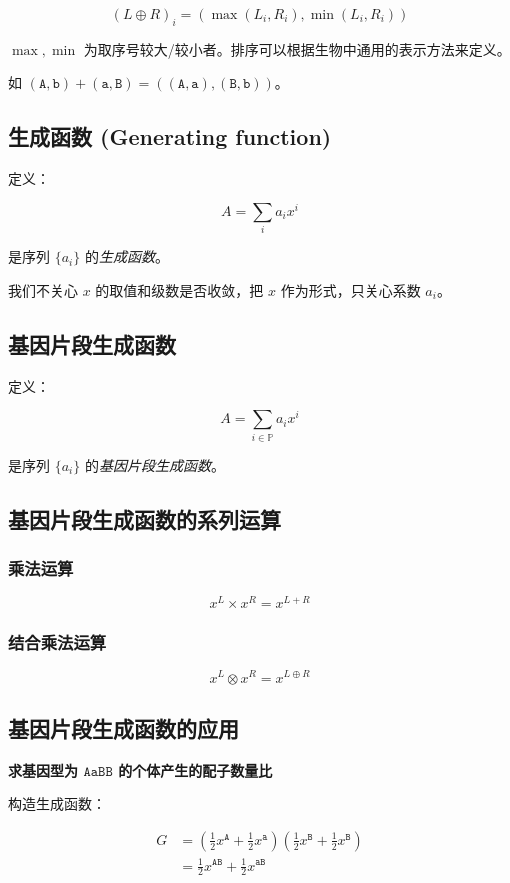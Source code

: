 \documentclass{article}
\begin{document}
$$(L \oplus R)_i=(\max(L_i,R_i),\min(L_i,R_i))$$

$\max,\min$ 为取序号较大/较小者。排序可以根据生物中通用的表示方法来定义。

如 $(\texttt{A},\texttt{b}) + (\texttt{a},\texttt{B})=((\texttt{A},\texttt{a}),(\texttt{B},\texttt{b}))$。

\subsection{生成函数 (Generating function)} 

定义：

$$A=\sum_{i} a_i x^{i}$$

是序列 $\{a_i\}$ 的\textsl{生成函数}。

我们不关心 $x$ 的取值和级数是否收敛，把 $x$ 作为形式，只关心系数 $a_i$。

\subsection{基因片段生成函数}

定义：

$$A=\sum_{i \in \mathbb{P}} a_i x^{i}$$

是序列 $\{a_i\}$ 的\textsl{基因片段生成函数}。

\subsection{基因片段生成函数的系列运算}

\subsubsection*{乘法运算}

$$x^L \times x^R=x^{L+R}$$

\subsubsection*{结合乘法运算}

$$x^L \otimes x^R=x^{L \oplus R}$$

\subsection{基因片段生成函数的应用}

\textbf{求基因型为 $\texttt{AaBB}$ 的个体产生的配子数量比}

构造生成函数：

$$\begin{aligned}
    G &= (\frac{1}{2} x^{\texttt{A}}+ \frac{1}{2}x^{\texttt{a}})(\frac{1}{2} x^{\texttt{B}}+ \frac{1}{2}x^{\texttt{B}}) \\
                &= \frac{1}{2} x^{\texttt{AB}} + \frac{1}{2} x^{\texttt{aB}}
\end{aligned}$$
\end{document}
